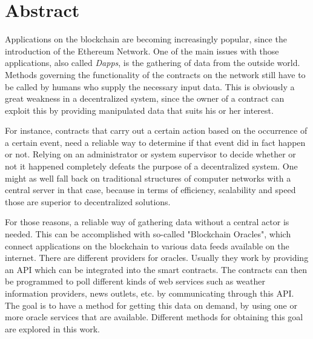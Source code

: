 \chapter{Abstract}


Applications on the blockchain are becoming increasingly popular, since the introduction of the Ethereum Network. One of the main issues with those applications, also called \emph{Dapps}, is the gathering of data from the outside world. Methods governing the functionality of the contracts on the network still have to be called by humans who supply the necessary input data. This is obviously a great weakness in a decentralized system, since the owner of a contract can exploit this by providing manipulated data that suits his or her interest.

For instance, contracts that carry out a certain action based on the occurrence of a certain event, need a reliable way to determine if that event did in fact happen or not. Relying on an administrator or system supervisor to decide whether or not it happened completely defeats the purpose of a decentralized system. One might as well fall back on traditional structures of computer networks with a central server in that case, because in terms of efficiency, scalability and speed those are superior to decentralized solutions.

For those reasons, a reliable way of gathering data without a central actor is needed. This can be accomplished with so-called "Blockchain Oracles", which connect applications on the blockchain to various data feeds available on the internet. There are different providers for oracles. Usually they work by providing an API which can be integrated into the smart contracts. The contracts can then be programmed to poll different kinds of web services such as weather information providers, news outlets, etc. by communicating through this API. The goal is to have a method for getting this data on demand, by using one or more oracle services that are available. Different methods for obtaining this goal are explored in this work. 
